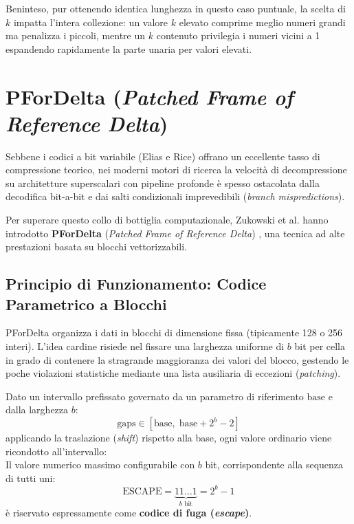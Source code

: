 Beninteso, pur ottenendo identica lunghezza in questo caso puntuale, la scelta di $k$ impatta l'intera collezione: un valore $k$ elevato comprime meglio numeri grandi ma penalizza i piccoli, mentre un $k$ contenuto privilegia i numeri vicini a 1 espandendo rapidamente la parte unaria per valori elevati.

\FloatBarrier
\section{PForDelta (\textit{Patched Frame of Reference Delta})}
\label{sec:pfordelta}

Sebbene i codici a bit variabile (Elias e Rice) offrano un eccellente tasso di compressione teorico, nei moderni motori di ricerca la velocit\`a di decompressione su architetture superscalari con pipeline profonde \`e spesso ostacolata dalla decodifica bit-a-bit e dai salti condizionali imprevedibili (\textit{branch mispredictions}).

Per superare questo collo di bottiglia computazionale, Zukowski et al. hanno introdotto \textbf{PForDelta} (\textit{Patched Frame of Reference Delta}) \cite{zheng2006pfordelta}, una tecnica ad alte prestazioni basata su blocchi vettorizzabili.

\FloatBarrier
\subsection{Principio di Funzionamento: Codice Parametrico a Blocchi}
\label{subsec:pfordelta-principio}

PForDelta organizza i dati in blocchi di dimensione fissa (tipicamente 128 o 256 interi). L'idea cardine risiede nel fissare una larghezza uniforme di $b$ bit per cella in grado di contenere la stragrande maggioranza dei valori del blocco, gestendo le poche violazioni statistiche mediante una lista ausiliaria di eccezioni (\textit{patching}).

Dato un intervallo prefissato governato da un parametro di riferimento $\text{base}$ e dalla larghezza $b$:
\begin{equation}
  \text{gaps} \in [\text{base}, \; \text{base} + 2^b - 2]
\end{equation}
applicando la traslazione (\textit{shift}) rispetto alla base, ogni valore ordinario viene ricondotto all'intervallo:
\begin{equation}
  [0, \; 2^b - 2]
\end{equation}
Il valore numerico massimo configurabile con $b$ bit, corrispondente alla sequenza di tutti uni:
\begin{equation}
  \text{ESCAPE} = \underbrace{11\dots1}_{b \text{ bit}} = 2^b - 1
\end{equation}
\`e riservato espressamente come \textbf{codice di fuga (\textit{escape})}.

